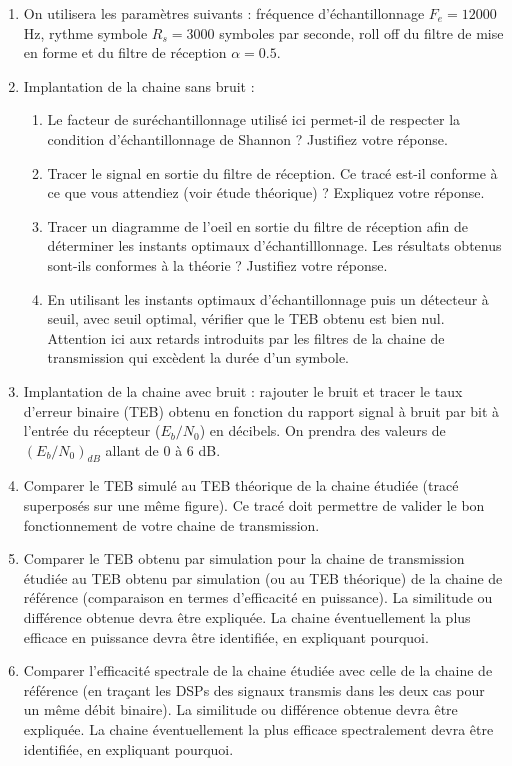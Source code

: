 \documentclass{article}
\begin{document}
    \begin{enumerate}
        \item On utilisera les paramètres suivants : fréquence d'échantillonnage $F_e=12000$ Hz, rythme symbole $R_s=3000$ symboles par seconde, roll off du filtre de mise en forme et du filtre de réception $\alpha=0.5$.
        \item Implantation de la chaine sans bruit :
            \begin{enumerate}
                \item Le facteur de suréchantillonnage utilisé ici permet-il de respecter la condition d'échantillonnage de Shannon ? Justifiez votre réponse.
                \item Tracer le signal en sortie du filtre de réception. Ce tracé est-il conforme à ce que vous attendiez (voir étude théorique) ? Expliquez votre réponse.
                \item Tracer un diagramme de l'oeil en sortie du filtre de réception afin de déterminer les instants optimaux d'échantilllonnage. Les résultats obtenus sont-ils conformes à la théorie ? Justifiez votre réponse.
                \item En utilisant les instants optimaux d'échantillonnage puis un détecteur à seuil, avec seuil optimal, vérifier que le TEB obtenu est bien nul. Attention ici aux retards introduits par les filtres de la chaine de transmission qui excèdent la durée d'un symbole.
            \end{enumerate}
        \item Implantation de la chaine avec bruit : rajouter le bruit et tracer le taux d'erreur binaire (TEB) obtenu en fonction du rapport signal à bruit par bit à l'entrée du récepteur ($E_b/N_0$) en décibels. On prendra des valeurs de $\left(E_b/N_0\right)_{dB}$ allant de $0$ à $6$ dB.
        \item Comparer le TEB simulé au TEB théorique de la chaine étudiée (tracé superposés sur une même figure). Ce tracé doit permettre de valider le bon fonctionnement de votre chaine de transmission.
        \item Comparer le TEB obtenu par simulation pour la chaine de transmission étudiée au TEB obtenu par simulation (ou au TEB théorique) de la chaine de référence (comparaison en termes d'efficacité en puissance). La similitude ou différence obtenue devra être expliquée. La chaine éventuellement la plus efficace en puissance devra être identifiée, en expliquant pourquoi.
        \item Comparer l'efficacité spectrale de la chaine étudiée avec celle de la chaine de référence (en traçant les DSPs des signaux transmis dans les deux cas pour un même débit binaire). La similitude ou différence obtenue devra être expliquée. La chaine éventuellement la plus efficace spectralement devra être identifiée, en expliquant pourquoi.\\

\end{enumerate}
\end{document}
